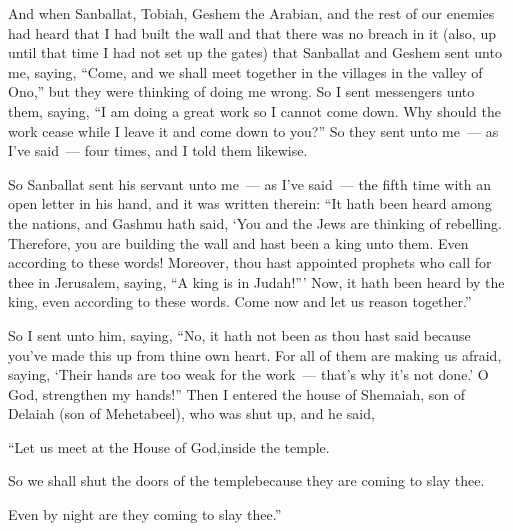 
\begin{inparaenum}
   And when Sanballat, Tobiah, Geshem the Arabian, and the rest of our enemies had heard that I had built the wall and that there was no breach in it (also, up until that time I had not set up the gates)%
   that Sanballat and Geshem sent unto me, saying, ``Come, and we shall meet together in the villages in the valley of Ono,'' but they were thinking of doing me wrong.%
   So I sent messengers unto them, saying, ``I am doing a great work so I cannot come down. Why should the work cease while I leave it and come down to you?''%
   So they sent unto me~--- as I've said~--- four times, and I told them likewise.%
  
   So Sanballat sent his servant unto me~--- as I've said~--- the fifth time with an open letter in his hand,%
   and it was written therein: ``It hath been heard among the nations, and Gashmu hath said, `You and the Jews are thinking of rebelling. Therefore, you are building the wall and hast been a king unto them. Even according to these words!%
   Moreover, thou hast appointed prophets who call for thee in Jerusalem, saying, ``A king is in Judah!''' Now, it hath been heard by the king, even according to these words. Come now and let us reason together.''%
  
   So I sent unto him, saying, ``No, it hath not been as thou hast said because you've made this up from thine own heart.%
   For all of them are making us afraid, saying, `Their hands are too weak for the work~--- that's why it's not done.' O God, strengthen my hands!''%
   Then I entered the house of Shemaiah, son of Delaiah (son of Mehetabeel), who was shut up, and he said,\smallskip%

  \pc ``Let us meet at the House of God,\pa inside the temple.%

  \pc So we shall shut the doors of the temple\pa because they are coming to slay thee.%

  \pc Even by night are they coming to slay thee.''\smallskip%
  

\end{inparaenum}
